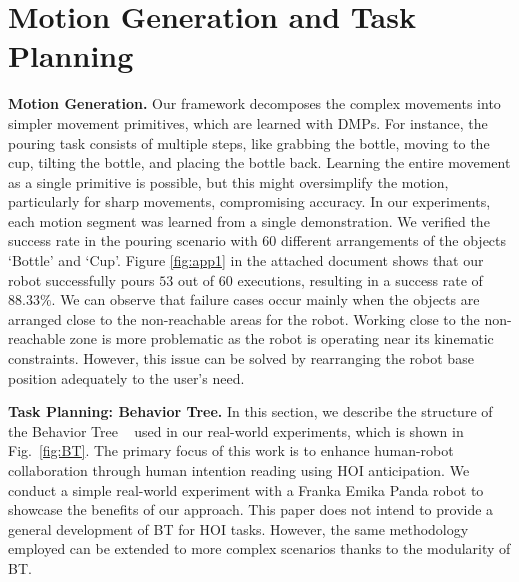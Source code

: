\documentclass{article}
\begin{document}
\section{Motion Generation and Task Planning}
\label{apx:motion}
\textbf{Motion Generation. }Our framework decomposes the complex movements into simpler movement primitives, which are learned with DMPs. For instance, the pouring task consists of multiple steps, like grabbing the bottle, moving to the cup, tilting the bottle, and placing the bottle back. Learning the entire movement as a single primitive is possible, but this might oversimplify the motion, particularly for sharp movements, compromising accuracy. In our experiments, each motion segment was learned from a single demonstration. We verified the success rate in the pouring scenario with 60 different arrangements of the objects `Bottle' and `Cup'. Figure \ref{fig:app1} in the attached document shows that our robot successfully pours $53$ out of $60$ executions, resulting in a success rate of $88.33\%$. We can observe that failure cases occur mainly when the objects are arranged close to the non-reachable areas for the robot. Working close to the non-reachable zone is more problematic as the robot is operating near its kinematic constraints. However, this issue can be solved by rearranging the robot base position adequately to the user's need. 
    
\textbf{Task Planning: Behavior Tree. } In this section, we describe the structure of the Behavior Tree ~\citep{BehaviorTrees} used in our real-world experiments, which is shown in Fig.~\ref{fig:BT}. The primary focus of this work is to enhance human-robot collaboration through human intention reading using HOI anticipation. We conduct a simple real-world experiment with a Franka Emika Panda robot to showcase the benefits of our approach. This paper does not intend to provide a general development of BT for HOI tasks. However, the same methodology employed can be extended to more complex scenarios thanks to the modularity of BT.

\begin{figure}[]
    
\end{figure}
\end{document}
